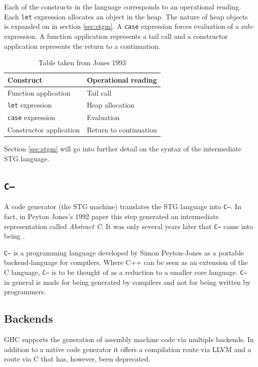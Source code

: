 \documentclass[runningheads]{llncs}
\begin{document}
Each of the constructs in the language corresponds to an operational reading.
Each \texttt{let} expression allocates an object in the heap. The nature of heap objects is expanded on in section \ref{sec:stgm}. A \texttt{case} expression forces evaluation of a sub-expression. A function application represents a tail call and a constructor application represents the return to a continuation. 

\begin{table}[H]
	\centering
	
	\begin{tabular}{|l|l|}
		\hline 
		Construct & Operational reading  \\ 
		\hline 
		Function application	& Tail call  \\  
		\texttt{let} expression	& Heap allocation  \\ 
		\texttt{case} expression	& Evaluation  \\ 
		Constructor application	& Return to continuation  \\ 
		\hline 
	\end{tabular} 
	\caption{Table taken from Jones 1993 \cite{jones1992implementing}}
\end{table}

Section \ref{sec:stgm} will go into further detail on the syntax of the intermediate STG language.

\subsection{\texttt{C--}}
\label{subsec:C--}

A code generator (the STG machine) translates the STG language into \texttt{C--}. In fact, in Peyton Jones's 1992 paper \cite{jones1992implementing} this step generated an intermediate representation called \textit{Abstract C}. It was only several years later that \texttt{C--} came into being \cite{jones1999c}.

\texttt{C--} is a programming language developed by Simon Peyton-Jones as a portable backend-language for compilers. Where C++ can be seen as an extension of the C language, \texttt{C--} is to be thought of as a reduction to a smaller core language. \texttt{C--} in general is made for being generated by compilers and not for being written by programmers. \cite{jones1999c}

\subsection{Backends}
GHC supports the generation of assembly machine code via multiple backends. In addition to a native code generator it offers a compilation route via LLVM and a route via C that has, however, been deprecated.
\end{document}

